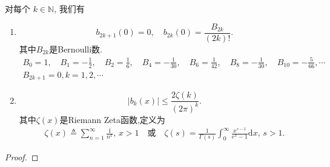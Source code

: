 \documentclass[../../main.tex]{subfiles}%
\begin{document}
\begin{proposition}[$b_n(x)$ 基本性质]\label{proposition:b_n(x)基本性质}
对每个 $k \in \mathbb{N}$, 我们有  
\begin{enumerate}
\item $$b_{2k+1}(0) = 0,\quad b_{2k}\left( 0 \right) =\frac{B_{2k}}{\left( 2k \right) !}.$$ 
其中$B_{2k}$是Bernoulli数.
\begin{gather*}
B_0 = 1,\quad B_1 = -\frac{1}{2},\quad B_2 = \frac{1}{6},\quad B_4 = -\frac{1}{30},\quad B_6 = \frac{1}{42},\quad B_8 = -\frac{1}{30},\quad B_{10} = -\frac{5}{66},\cdots
\\
B_{2k+1}=0,k=1,2,\cdots
\end{gather*}

\item $$|b_k(x)| \leqslant \frac{2\zeta(k)}{(2\pi)^k}.$$
其中$\zeta(x)$是Riemann Zeta函数,定义为
\begin{align*}
\zeta(x) \triangleq \sum\limits_{n=1}^\infty \frac{1}{n^x},\,x > 1 \quad \text{或} \quad
\zeta(s) = \frac{1}{\Gamma(s)} \int_0^\infty \frac{x^{s - 1}}{e^x - 1} \mathrm{d}x,\,s>1.
\end{align*}
\end{enumerate}
\end{proposition}
\begin{proof}



\end{proof}
\end{document}
